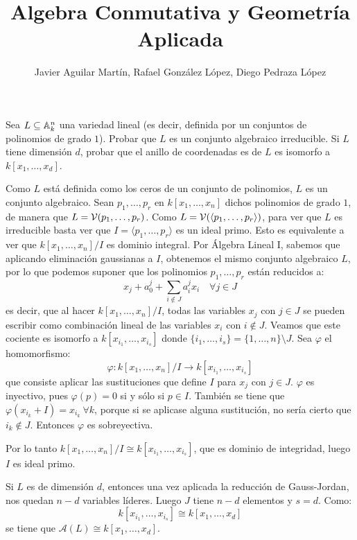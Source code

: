 \documentclass[twoside]{article}
\begin{document}
\title{Algebra Conmutativa y Geometría Aplicada}
\author{Javier Aguilar Martín, Rafael González López, Diego Pedraza López}
\maketitle
\begin{ejercicio}{1}
Sea $L \subseteq \mathbb{A}_k^n$ una variedad lineal (es decir, definida por un conjuntos de polinomios de grado $1$). Probar que $L$ es un conjunto algebraico irreducible. Si $L$ tiene dimensión $d$, probar que el anillo de coordenadas es de $L$ es isomorfo a $k[x_1,\dots,x_d]$.
\end{ejercicio}

\begin{sol}
Como $L$ está definida como los ceros de un conjunto de polinomios, $L$ es un conjunto algebraico. Sean $p_1,\dots,p_r$ en $k[x_1,\dots,x_n]$ dichos polinomios de grado $1$, de manera que $L=\mathcal{V}(p_1,\dots,p_r)$. Como $L=\mathcal{V}(\langle p_1,\dots,p_r\rangle)$, para ver que $L$ es irreducible basta ver que $I=\langle p_1,\dots,p_r\rangle$ es un ideal primo. Esto es equivalente a ver que $k[x_1,\dots,x_n]/I$ es dominio integral. Por Álgebra Lineal I, sabemos que aplicando eliminación gaussianas a $I$, obtenemos el mismo conjunto algebraico $L$, por lo que podemos suponer que los polinomios $p_1,\dots,p_r$ están reducidos a:
\[ x_j + a_0^j + \sum_{i\notin J}a_i^j x_i \quad \forall j \in J \]
es decir, que al hacer $k[x_1,\dots,x_n]/I$, todas las variables $x_j$ con $j\in J$ se pueden escribir como combinación lineal de las variables $x_i$ con $i \notin J$. Veamos que este cociente es isomorfo a $k[x_{i_1},\dots,x_{i_s}]$ donde $\{i_1,\dots,i_s\}=\{1,\dots,n\}\setminus J$. Sea $φ$ el homomorfismo:
\[ φ : k[x_1,\dots,x_n]/I \to k[x_{i_1},\dots,x_{i_s}] \]
que consiste aplicar las sustituciones que define $I$ para $x_j$ con $j \in J$. $φ$ es inyectivo, pues $φ(p) = 0$ si y sólo si $p \in I$. También se tiene que $φ(x_{i_k}+I)=x_{i_k} \ \forall k$, porque si se aplicase alguna sustitución, no sería cierto que $i_k \notin J$. Entonces $φ$ es sobreyectiva.

Por lo tanto $k[x_1,\dots,x_n]/I \cong k[x_{i_1},\dots,x_{i_s}]$, que es dominio de integridad, luego $I$ es ideal primo.

Si $L$ es de dimensión $d$, entonces una vez aplicada la reducción de Gauss-Jordan, nos quedan $n-d$ variables líderes. Luego $J$ tiene $n-d$ elementos y $s = d$. Como:
\[ k[x_{i_1},\dots,x_{i_s}] \cong k[x_1,\dots,x_d] \]
se tiene que $\mathcal{A}(L) \cong k[x_1,\dots,x_d]$.
\end{sol}
\end{document}
